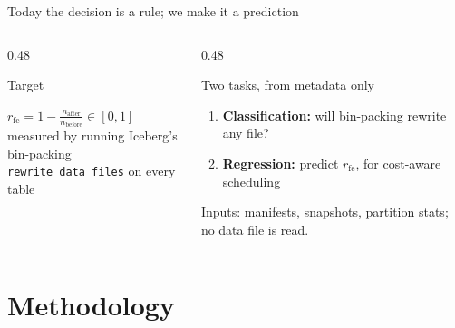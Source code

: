 \documentclass[aspectratio=169, 10pt]{beamer}
\newcommand{\rfc}{r_{\mathrm{fc}}}
\begin{document}
\begin{frame}{Today the decision is a rule; we make it a prediction}
\vspace{1mm}
\begin{columns}[T]
\begin{column}{0.48\textwidth}
\begin{block}{Target}
\parbox[t][22mm][t]{\linewidth}{%
  \centering
  $\displaystyle \rfc = 1 - \frac{n_{\mathrm{after}}}{n_{\mathrm{before}}} \in [0,1]$\\[5pt]
  \small measured by running Iceberg's bin-packing\\
  \texttt{rewrite\_data\_files} on every table\par}
\end{block}
\end{column}
\begin{column}{0.48\textwidth}
\begin{block}{Two tasks, from metadata only}
\parbox[t][22mm][t]{\linewidth}{%
  \begin{enumerate}\small
    \item \textbf{Classification:} will bin-packing rewrite any file?
    \item \textbf{Regression:} predict $\rfc$, for cost-aware scheduling
  \end{enumerate}
  \small Inputs: manifests, snapshots, partition stats; no data file is read.\par}
\end{block}
\end{column}
\end{columns}
\end{frame}

\section{Methodology}

\end{document}

